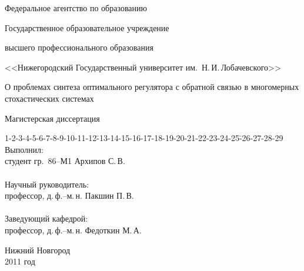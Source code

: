 
\begin{titlepage}
    \begin{center}
        \par Федеральное агентство по образованию\vspace{0.7mm}
        \par Государственное образовательное учреждение\vspace{0.7mm}
        \par высшего профессионального образования\vspace{1.5mm}
        \par <<Нижегородский Государственный университет им.~Н.\,И.\,Лобачевского>>
        \vspace{1cm}
        {\fontsize{18pt}{9mm}  \selectfont
            \par О проблемах синтеза оптимального регулятора с обратной связью в многомерных стохастических системах
        }
        \vspace{2cm}
        \par {\large Магистерская диссертация}
    \end{center}
    \vspace{2cm}
    \begin{tabbing}
        1-2-3-4-5-6-7-8-9-10-11-12\=-13-14-15-16-17-18-19-20-21-22-23-24-25\=-26-27-28-29 \kill
        {\fontsize{10pt}{10pt} \selectfont Выполнил:}                 \>                      \>                 \\
        {\fontsize{10pt}{10pt} \selectfont студент гр.~86--М1}        \>                      \> {\fontsize{10pt}{10pt} \selectfont Архипов С.\,В.}  \\
        \\
        {\fontsize{10pt}{10pt} \selectfont Научный руководитель:}     \>                      \>                 \\
        {\fontsize{10pt}{10pt} \selectfont профессор, д.\,ф.--м.\,н.} \>                      \> {\fontsize{10pt}{10pt} \selectfont Пакшин П.\,В.}   \\
        \\
        {\fontsize{10pt}{10pt} \selectfont Заведующий кафедрой:}     \>                      \>                 \\
        {\fontsize{10pt}{10pt} \selectfont профессор, д.\,ф.--м.\,н.} \>                      \> {\fontsize{10pt}{10pt} \selectfont Федоткин М.\,А.}
    \end{tabbing}
    \vspace{3cm}
    \begin{center} {\fontsize{10pt}{3mm}  \selectfont
        Нижний Новгород \\
        2011 год
    } \end{center}
\end{titlepage}

